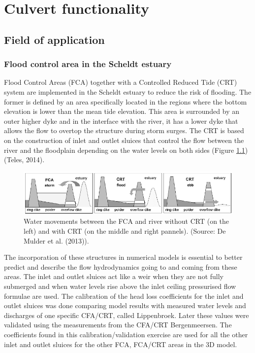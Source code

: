 \chapter{Culvert functionality}

\section{Field of application}

\subsection{Flood control area in the Scheldt estuary}
Flood Control Areas (FCA) together with a Controlled Reduced Tide (CRT) system 
are implemented in the Scheldt estuary to reduce the risk of flooding. 
The former is defined by an area specifically located in the regions where 
the bottom elevation is lower than the mean tide elevation. 
This area is surrounded by an outer higher dyke and in the interface with the river, 
it has a lower dyke that allows the flow to overtop the structure during storm surges. 
The CRT is based on the construction of inlet and outlet sluices that control the 
flow between the river and the floodplain depending on the water levels on both 
sides (Figure \ref{fig:culvert_fig1}) (Teles, 2014).

\begin{figure}[H]
\begin{center}
  \includegraphics[scale=0.7]{culvert_fig1.png}
\end{center}
\caption{Water movements between the FCA and river without 
CRT (on the left) and with CRT (on the middle and right pannels). 
(Source: De Mulder et al. (2013)).}
\label{fig:culvert_fig1}
\end{figure}

The incorporation of these structures in numerical models is essential 
to better predict and describe the flow hydrodynamics going to and 
coming from these areas. The inlet and outlet sluices act like a weir 
when they are not fully submerged and when water levels rise above the 
inlet ceiling pressurised flow formulae are used. 
The calibration of the head loss coefficients for the inlet and outlet sluices 
was done comparing model results with measured water levels and discharges of 
one specific CFA/CRT, called Lippenbroek. 
Later these values were validated using the measurements from the CFA/CRT Bergenmeersen. 
The coefficients found in this calibration/validation exercise are used for all the 
other inlet and outlet sluices for the other FCA, FCA/CRT areas in the 3D model.

